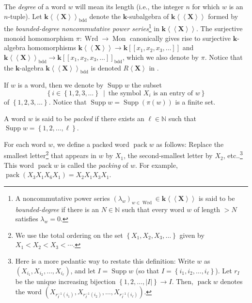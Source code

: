 \documentclass
[numbers=enddot,12pt,final,onecolumn,notitlepage,abstracton]{scrartcl}%
\theoremstyle{definition}
\begin{document}
The \textit{degree} of a word $w$ will mean its length (i.e., the integer $n$
for which $w$ is an $n$-tuple). Let $\mathbf{k}\left\langle \left\langle
\mathbf{X}\right\rangle \right\rangle _{\operatorname*{bdd}}$ denote the
$\mathbf{k}$-subalgebra of $\mathbf{k}\left\langle \left\langle \mathbf{X}%
\right\rangle \right\rangle $ formed by the \textit{bounded-degree
noncommutative power series}\footnote{A noncommutative power series $\left(
\lambda_{w}\right)  _{w\in\operatorname*{Wrd}}\in\mathbf{k}\left\langle
\left\langle \mathbf{X}\right\rangle \right\rangle $ is said to be
\textit{bounded-degree} if there is an $N\in\mathbb{N}$ such that every word
$w$ of length $>N$ satisfies $\lambda_{w}=0$.} in $\mathbf{k}\left\langle
\left\langle \mathbf{X}\right\rangle \right\rangle $. The surjective monoid
homomorphism $\pi:\operatorname*{Wrd}\rightarrow\operatorname*{Mon}$
canonically gives rise to surjective $\mathbf{k}$-algebra homomorphisms
$\mathbf{k}\left\langle \left\langle \mathbf{X}\right\rangle \right\rangle
\rightarrow\mathbf{k}\left[  \left[  x_{1},x_{2},x_{3},\ldots\right]  \right]
$ and $\mathbf{k}\left\langle \left\langle \mathbf{X}\right\rangle
\right\rangle _{\operatorname*{bdd}}\rightarrow\mathbf{k}\left[  \left[
x_{1},x_{2},x_{3},\ldots\right]  \right]  _{\operatorname*{bdd}}$, which we
also denote by $\pi$. Notice that the $\mathbf{k}$-algebra $\mathbf{k}%
\left\langle \left\langle \mathbf{X}\right\rangle \right\rangle
_{\operatorname*{bdd}}$ is denoted $R\left\langle \mathbf{X}\right\rangle $ in
\cite[Section 8.1]{Reiner}.

If $w$ is a word, then we denote by $\operatorname*{Supp}w$ the subset%
\[
\left\{  i\in\left\{  1,2,3,\ldots\right\}  \ \mid\ \text{the symbol }%
X_{i}\text{ is an entry of }w\right\}
\]
of $\left\{  1,2,3,\ldots\right\}  $. Notice that $\operatorname*{Supp}%
w=\operatorname*{Supp}\left(  \pi\left(  w\right)  \right)  $ is a finite set.

A word $w$ is said to be \textit{packed} if there exists an $\ell\in
\mathbb{N}$ such that $\operatorname*{Supp}w=\left\{  1,2,\ldots,\ell\right\}
$.

For each word $w$, we define a packed word $\operatorname*{pack}w$ as follows:
Replace the smallest letter\footnote{We use the total ordering on the set
$\left\{  X_{1},X_{2},X_{3},\ldots\right\}  $ given by $X_{1}<X_{2}%
<X_{3}<\cdots$.} that appears in $w$ by $X_{1}$, the second-smallest letter by
$X_{2}$, etc..\footnote{Here is a more pedantic way to restate this
definition: Write $w$ as $\left(  X_{i_{1}},X_{i_{2}},\ldots,X_{i_{\ell}%
}\right)  $, and let $I=\operatorname*{Supp}w$ (so that $I=\left\{
i_{1},i_{2},\ldots,i_{\ell}\right\}  $). Let $r_{I}$ be the unique increasing
bijection $\left\{  1,2,\ldots,\left\vert I\right\vert \right\}  \rightarrow
I$. Then, $\operatorname*{pack}w$ denotes the word $\left(  X_{r_{I}%
^{-1}\left(  i_{1}\right)  },X_{r_{I}^{-1}\left(  i_{2}\right)  }%
,\ldots,X_{r_{I}^{-1}\left(  i_{\ell}\right)  }\right)  $.} This word
$\operatorname*{pack}w$ is called the \textit{packing} of $w$. For example,
$\operatorname*{pack}\left(  X_{3}X_{1}X_{6}X_{1}\right)  =X_{2}X_{1}%
X_{3}X_{1}$.
\end{document}

